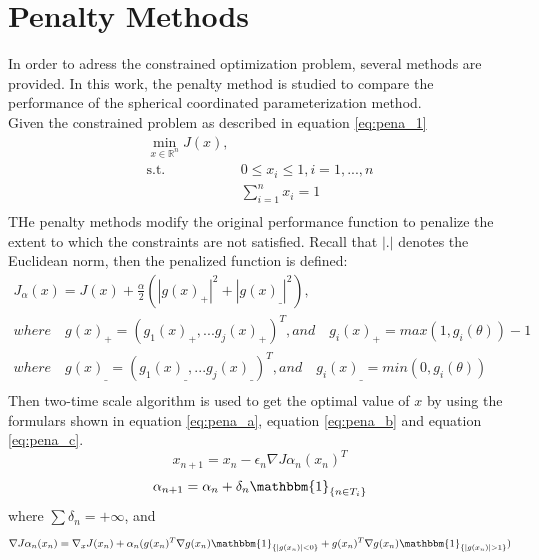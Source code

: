 \documentclass[a4paper,12pt]{article}
\begin{document}
\section{Penalty Methods}
In order to adress the constrained optimization problem, several methods are provided. In this work, the penalty method is studied to compare the performance of the spherical coordinated parameterization method.\\
Given the constrained problem as described in equation \ref{eq:pena_1}
\begin{equation}\label{eq:pena_1}
\begin{aligned}
\min_{x\in \mathbb{R}^n}J(x), \\
\textrm{s.t.} \quad & 0 \leq x_i \leq 1, i=1,...,n\\
              \quad & \sum_{i=1}^{n} x_i = 1\\
\end{aligned}
\end{equation}
THe penalty methods modify the original performance function to penalize the extent to which the constraints are not satisfied. Recall that $|.|$ denotes the Euclidean norm, then the penalized function is defined:\\
\begin{equation} \label{eq:pena_2}
\begin{aligned}
J_{\alpha}(x) = J(x)+\frac{\alpha}{2}(|g(x)_{+}|^2+|g(x)_{\_}|^2),\\
where \quad g(x)_{+} =(g_1(x)_{+},...g_j(x)_{+})^T, and \quad g_i(x)_{+} = max(1,g_i(\theta))-1\\
where \quad g(x)_{\_} =(g_1(x)_{\_},...g_j(x)_{\_})^T, and \quad g_i(x)_{\_} = min(0,g_i(\theta))\\
\end{aligned}
\end{equation}
Then two-time scale algorithm is used to get the optimal value of $x$ by using the formulars shown in equation \ref{eq:pena_a}, equation \ref{eq:pena_b} and equation \ref{eq:pena_c}. \\
\begin{equation} \label{eq:pena_a}
x_{n+1}=x_n-\epsilon _n \nabla J{\alpha_ n}(x_n)^T
\end{equation}
\begin{equation}\label{eq:pena_b}
\alpha_{n+1}=\alpha_n+\delta _n \mathbbm{1} _{\{n\in {T_i}\}}
\end{equation}
where $\sum \delta_n = + \infty$, and\\
\begin{equation}\label{eq:pena_c}
\nabla J{\alpha_ n}(x_n) =\nabla _x J(x_n)+\alpha_n(g(x_n)^T \nabla g(x_n) \mathbbm{1}_{\{|g(x_n)|<0\}}+g(x_n)^T \nabla g(x_n) \mathbbm{1}_{\{|g(x_n)|>1\}})
\end{equation}
\end{document}
